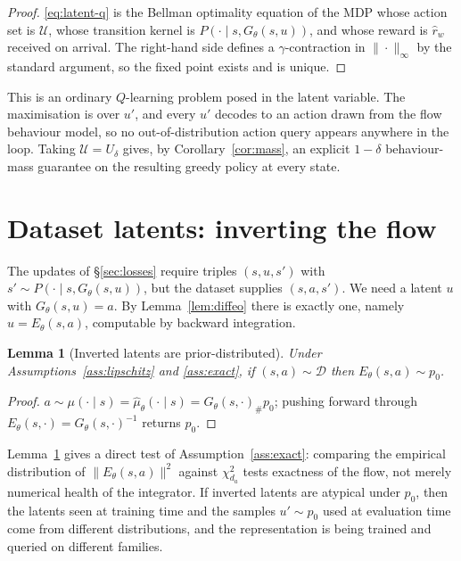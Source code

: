 \documentclass[11pt]{article}
\theoremstyle{plain}
\newtheorem{lemma}{Lemma}[section]
\theoremstyle{definition}
\theoremstyle{remark}
\newcommand{\D}{\mathcal D}
\newcommand{\1}{\mathbf 1}
\newcommand{\Gth}{G_\theta}
\newcommand{\Eth}{E_\theta}
\newcommand{\muhat}{\hat\mu_\theta}
\newcommand{\Udelta}{U_\delta}
\begin{document}
\begin{proof}
\eqref{eq:latent-q} is the Bellman optimality equation of the MDP whose action set is
$\mathcal U$, whose transition kernel is $P(\cdot\mid s,\Gth(s,u))$, and whose reward is
$\hat r_w$ received on arrival. The right-hand side defines a $\gamma$-contraction in
$\|\cdot\|_\infty$ by the standard argument, so the fixed point exists and is unique.
\end{proof}

\noindent
This is an ordinary $Q$-learning problem posed in the latent variable. The maximisation is
over $u'$, and every $u'$ decodes to an action drawn from the flow behaviour model, so no
out-of-distribution action query appears anywhere in the loop. Taking $\mathcal U=\Udelta$
gives, by Corollary~\ref{cor:mass}, an explicit $1-\delta$ behaviour-mass guarantee on the
resulting greedy policy at every state.

\section{Dataset latents: inverting the flow}
\label{sec:preimage}

The updates of \S\ref{sec:losses} require triples $(s,u,s')$ with
$s'\sim P(\cdot\mid s,\Gth(s,u))$, but the dataset supplies $(s,a,s')$. We need a latent
$u$ with $\Gth(s,u)=a$. By Lemma~\ref{lem:diffeo} there is exactly one, namely
$u=\Eth(s,a)$, computable by backward integration.

\begin{lemma}[Inverted latents are prior-distributed]
\label{lem:typicality}
Under Assumptions~\ref{ass:lipschitz} and \ref{ass:exact}, if $(s,a)\sim\D$ then
$\Eth(s,a)\sim p_0$.
\end{lemma}

\begin{proof}
$a\sim\mu(\cdot\mid s)=\muhat(\cdot\mid s)=\Gth(s,\cdot)_\#p_0$; pushing forward through
$\Eth(s,\cdot)=\Gth(s,\cdot)^{-1}$ returns $p_0$.
\end{proof}

\noindent
Lemma~\ref{lem:typicality} gives a direct test of Assumption~\ref{ass:exact}: comparing the empirical distribution of $\|\Eth(s,a)\|^2$
against $\chi^2_{d_a}$ tests exactness of the flow, not merely numerical health of the
integrator. If inverted latents are atypical under $p_0$, then the latents seen at training
time and the samples $u'\sim p_0$ used at evaluation time come from different
distributions, and the representation is being trained and queried on different families.
\end{document}
